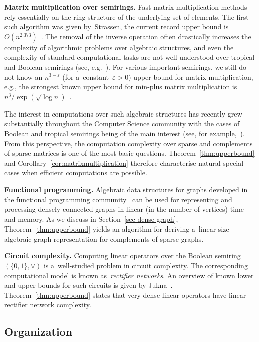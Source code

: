 \documentclass[review,onefignum,onetabnum]{siamart190516}
\begin{document}
\textbf{Matrix multiplication over semirings.} Fast matrix
multiplication methods rely essentially on the ring structure of the underlying
set of elements. The first such algorithm was given by~Strassen,
the current record upper bound is
$O(n^{2.373})$~\cite{DBLP:conf/stoc/Williams12, DBLP:conf/issac/Gall14a}.
The removal of the inverse operation often drastically increases the complexity
of algorithmic problems over algebraic structures, and even the complexity of
standard computational tasks are not well understood over tropical and
Boolean semirings (see, e.g.~\cite{Williams14,GrigorievP15}).
For various important semirings,
we still do not know an $n^{3-\varepsilon}$ (for a~constant~$\varepsilon>0$)
upper bound for matrix multiplication, e.g., the strongest known upper bound for
min-plus matrix multiplication is $n^3/\exp(\sqrt{\log n})$~\cite{Williams14}.

The interest in computations over such algebraic structures has
recently grew substantially throughout the
Computer Science community with the cases of Boolean and
tropical semirings being of the main interest (see, for
example,~\cite{Jukna16,Williams14,butkovic10systems}).
From this perspective, the computation complexity over sparse and complements of
sparse matrices is one of the most basic questions.
Theorem~\ref{thm:upperbound} and Corollary~\ref{cor:matrixmultiplication}
therefore characterise natural special
cases when efficient computations are possible.

\textbf{Functional programming.}
Algebraic data structures for graphs developed in the functional programming
community~\cite{mokhov2017algebraic} can be used for representing and processing
densely-connected graphs in linear (in the number of vertices) time and memory.
As we discuss in Section~\ref{sec-dense-graph}, Theorem~\ref{thm:upperbound}
yields an algorithm for deriving a~linear-size algebraic graph representation
for complements of sparse graphs.

\textbf{Circuit complexity.} Computing linear operators over
the Boolean semiring $(\{0,1\}, \lor)$ is a~well-studied problem
in circuit complexity. The corresponding computational model is known
as~\emph{rectifier networks}. An overview of known lower and upper bounds for
such circuits is given by Jukna~\cite[Section~13.6]{DBLP:books/daglib/0028687}.
Theorem~\ref{thm:upperbound} states that very dense linear operators have
linear rectifier network complexity.

\subsection{Organization}
\end{document}

